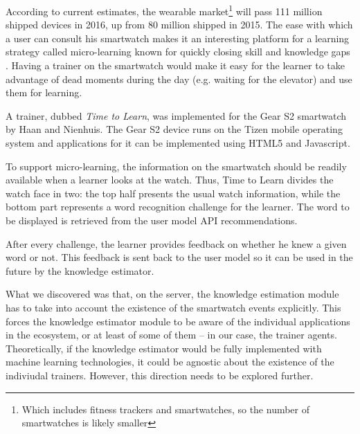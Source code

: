 According to current estimates, the wearable market\footnote{Which includes fitness trackers and smartwatches, so the number of smartwatches is likely smaller} will pass 111 million shipped devices in 2016, up from 80 million shipped in 2015. The ease with which a user can consult his smartwatch makes it an interesting platform for a learning strategy called micro-learning known for quickly closing skill and knowledge gaps  \cite{Dear12}. Having a trainer on the smartwatch would make it easy for the learner to take advantage of dead moments during the day (e.g. waiting for the elevator) and use them for learning.

A trainer, dubbed {\em Time to Learn}, was implemented for the Gear S2 smartwatch by Haan and Nienhuis\cite{Nien16time}. The Gear S2 device runs on the Tizen mobile operating system and applications for it can be implemented using HTML5 and Javascript.

To support micro-learning, the information on the smartwatch should be readily available when a learner looks at the watch. Thus, Time to Learn divides the watch face in two: the top half presents the usual watch information, while the bottom part represents a word recognition challenge for the learner. The word to be displayed is retrieved from the user model API recommendations. 

After every challenge, the learner provides feedback on whether he knew a given word or not. This feedback is sent back to the user model so it can be used in the future by the knowledge estimator. 

What we discovered was that, on the server, the knowledge estimation module has to take into account the existence of the smartwatch events explicitly. This forces the knowledge estimator module to be aware of the individual applications in the ecosystem, or at least of some of them -- in our case, the trainer agents. Theoretically, if the knowledge estimator would be fully implemented with machine learning technologies, it could be agnostic about the existence of the indiviudal trainers. However, this direction needs to be explored further.



